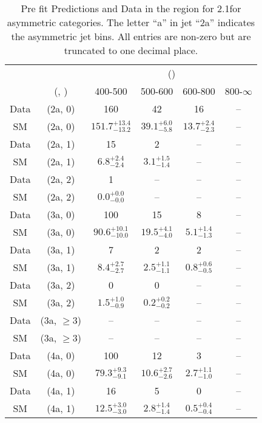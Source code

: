 \begin{table}[h!]
\tiny
\centering
\caption{Pre fit Predictions and Data in the \gj region for 2.1\ifb for asymmetric categories. The letter ``a'' in jet \eg ``2a''  indicates the asymmetric jet bins. All entries are non-zero but are truncated to one decimal place.\label{tab:predallqcdnaive_gj_comb_asym}}
\begin{tabular}
{cccccc}
	\hline\hline
	&	& \multicolumn{4}{c}{\scalht (\gev)}\\ 
	&	 (\njet, \nb) & 400-500 & 500-600 & 600-800 & 800-$\infty$ \\ [0.8ex] 
\hline
	Data & (2a, 0) & 160 & 42 & 16 & -- \\[0.5ex] 
	SM & (2a, 0) & $151.7^{+ 13.4 }_{- 13.2 }$ & $39.1^{+ 6.0 }_{- 5.8 }$ & $13.7^{+ 2.4 }_{- 2.3 }$ & -- \\[0.5ex] 
	Data & (2a, 1) & 15 & 2 & -- & -- \\[0.5ex] 
	SM & (2a, 1) & $6.8^{+ 2.4 }_{- 2.4 }$ & $3.1^{+ 1.5 }_{- 1.4 }$ & -- & -- \\[0.5ex] 
	Data & (2a, 2) & 1 & -- & -- & -- \\[0.5ex] 
	SM & (2a, 2) & $0.0^{+ 0.0 }_{- 0.0 }$ & -- & -- & -- \\[0.5ex] 
	Data & (3a, 0) & 100 & 15 & 8 & -- \\[0.5ex] 
	SM & (3a, 0) & $90.6^{+ 10.1 }_{- 10.0 }$ & $19.5^{+ 4.1 }_{- 4.0 }$ & $5.1^{+ 1.4 }_{- 1.3 }$ & -- \\[0.5ex] 
	Data & (3a, 1) & 7 & 2 & 2 & -- \\[0.5ex] 
	SM & (3a, 1) & $8.4^{+ 2.7 }_{- 2.7 }$ & $2.5^{+ 1.1 }_{- 1.1 }$ & $0.8^{+ 0.6 }_{- 0.5 }$ & -- \\[0.5ex] 
	Data & (3a, 2) & 0 & 0 & -- & -- \\[0.5ex] 
	SM & (3a, 2) & $1.5^{+ 1.0 }_{- 0.9 }$ & $0.2^{+ 0.2 }_{- 0.2 }$ & -- & -- \\[0.5ex] 
	Data & (3a, $\ge3$) & -- & -- & -- & -- \\[0.5ex] 
	SM & (3a, $\ge3$) & -- & -- & -- & -- \\[0.5ex] 
	Data & (4a, 0) & 100 & 12 & 3 & -- \\[0.5ex] 
	SM & (4a, 0) & $79.3^{+ 9.3 }_{- 9.1 }$ & $10.6^{+ 2.7 }_{- 2.6 }$ & $2.7^{+ 1.1 }_{- 1.0 }$ & -- \\[0.5ex] 
	Data & (4a, 1) & 16 & 5 & 0 & -- \\[0.5ex] 
	SM & (4a, 1) & $12.5^{+ 3.0 }_{- 3.0 }$ & $2.8^{+ 1.4 }_{- 1.4 }$ & $0.5^{+ 0.4 }_{- 0.4 }$ & -- \\[0.5ex] 

\end{tabular}
\end{table}
